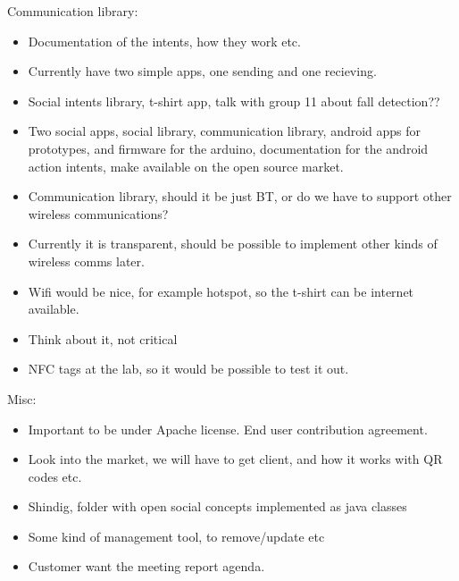 Communication library:
\begin{itemize}
\item Documentation of the intents, how they work etc.
\item Currently have two simple apps, one sending and one recieving.
\item Social intents library, t-shirt app, talk with group 11 about fall detection??
\item Two social apps, social library, communication library, android apps for prototypes, and firmware for the arduino, documentation for the android action intents, make available on the open source market.
\item Communication library, should it be just BT, or do we have to support other wireless communications?
\item Currently it is transparent, should be possible to implement other kinds of wireless comms later.
\item Wifi would be nice, for example hotspot, so the t-shirt can be internet available.
\item Think about it, not critical
\item NFC tags at the lab, so it would be possible to test it out.
\end{itemize}

Misc:
\begin{itemize}
\item Important to be under Apache license. End user contribution agreement.
\item Look into the market, we will have to get client, and how it works with QR codes etc.
\item Shindig, folder with open social concepts implemented as java classes
\item Some kind of management tool, to remove/update etc
\item Customer want the meeting report agenda.
\end{itemize}
